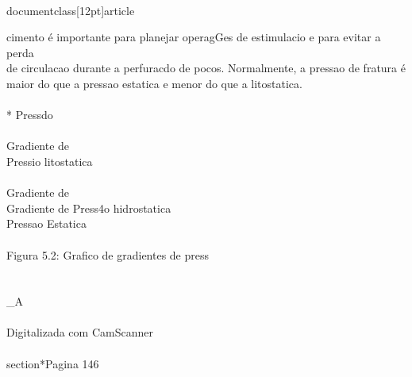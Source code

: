 \\documentclass[12pt]{article}
\begin{document}
{cimento é importante para planejar operagGes de estimulacio e para evitar a perda\\
de circulacao durante a perfuracdo de pocos. Normalmente, a pressao de fratura é\\
maior do que a pressao estatica e menor do que a litostatica.\\
\\
* Pressdo\\
\\
Gradiente de\\
Pressio litostatica\\
\\
Gradiente de\\
Gradiente de Press4o hidrostatica\\
Pressao Estatica\\
\\
Figura 5.2: Grafico de gradientes de press\\
\\
\\_A\\
\\
Digitalizada com CamScanner\\

\\section*{Pagina 146}

}
\end{document}
